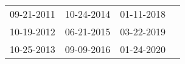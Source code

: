 \begin{supertabular}{llll}
 09-21-2011 &  10-24-2014 &  01-11-2018 \\
 10-19-2012 &  06-21-2015 &  03-22-2019 \\
 10-25-2013 &  09-09-2016 &  01-24-2020 \\
\end{supertabular}
